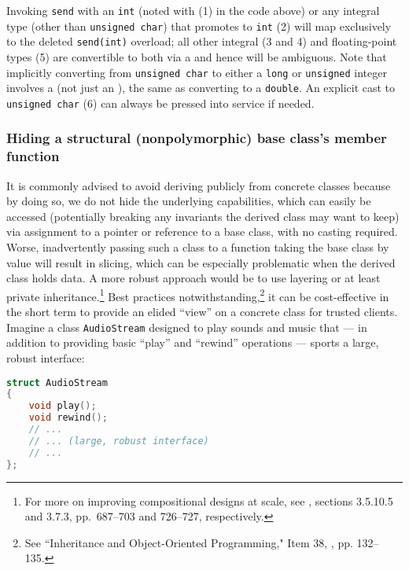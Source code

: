 \noindent Invoking \lstinline!send! with an \lstinline!int! (noted with (1) in the code above) or any integral type
(other than \lstinline!unsigned!~\lstinline!char!) that promotes to \lstinline!int! (2)
will map exclusively to the deleted \lstinline!send(int)! overload; all
other integral (3 and 4) and floating-point types (5) are convertible to
both via a  and hence will be ambiguous. Note that
implicitly converting from \lstinline!unsigned!~\lstinline!char! to either a
\lstinline!long! or \lstinline!unsigned! integer involves a  (not just an ), the same as
  converting to a \lstinline!double!. 
An explicit cast to \lstinline!unsigned!~\lstinline!char! (6) can always be
pressed into service if needed.

\subsubsection[Hiding a structural (nonpolymorphic) base class's member function]{Hiding a structural (nonpolymorphic) base class’s member function}\label{hiding-a-structural-(nonpolymorphic)-base-class's-member-function}

It is commonly advised to avoid deriving publicly from concrete classes because by doing so, we do not hide the underlying capabilities, which can easily be accessed (potentially breaking any invariants the derived class may want to keep) via assignment to a pointer or reference to a base class, with no casting required.  Worse, inadvertently passing such a class to a function taking the base class by value will result in slicing, which can be especially problematic when the derived class holds data. A more robust approach would be to use layering or at least private inheritance.\footnote{For more on improving compositional designs at scale, see
  \cite{lakos20}, sections 3.5.10.5 and 3.7.3, pp.~687--703 and
  726--727, respectively.} Best practices notwithstanding,\footnote{See ``Inheritance and Object-Oriented Programming," Item 38, \cite{meyers92}, pp. 132--135.} it can be cost-effective in the short
term to provide an elided ``view'' on a concrete class for trusted
clients. Imagine a class \lstinline!AudioStream! designed to play sounds
and music that --- in addition to providing basic ``play'' and
``rewind'' operations --- sports a large, robust interface:

\begin{lstlisting}[language=C++]
struct AudioStream
{
    void play();
    void rewind();
    // ...
    // ... (large, robust interface)
    // ...
};
\end{lstlisting}
    

